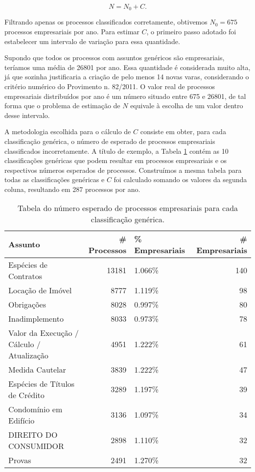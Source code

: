 \documentclass[]{book}
\begin{document}
\[ 
N = N_0 + C.
\]

Filtrando apenas os processos classificados corretamente, obtivemos
\(N_0 = 675\) processos empresariais por ano. Para estimar \(C\), o
primeiro passo adotado foi estabelecer um intervalo de variação para
essa quantidade.

Supondo que todos os processos com assuntos genéricos são empresariais,
teríamos uma média de 26801 por ano. Essa quantidade é considerada muito
alta, já que sozinha justificaria a criação de pelo menos 14 novas
varas, considerando o critério numérico do Provimento n. 82/2011. O
valor real de processos empresariais distribuídos por ano é um número
situado entre 675 e 26801, de tal forma que o problema de estimação de
\(N\) equivale à escolha de um valor dentro desse intervalo.

A metodologia escolhida para o cálculo de \(C\) consiste em obter, para
cada classificação genérica, o número de esperado de processos
empresariais classificados incorretamente. A título de exemplo, a Tabela
\ref{tab:esperados} contém as 10 classificações genéricas que podem
resultar em processos empresariais e os respectivos números esperados de
processos. Construímos a mesma tabela para todas as classificações
genéricas e \(C\) foi calculado somando os valores da segunda coluna,
resultando em 287 processos por ano.

\begin{longtable}[t]{lrlr}
\caption{\label{tab:esperados}Tabela do número esperado de processos empresariais para cada classificação genérica.}\\
\toprule
Assunto & \# Processos & \% Empresariais & \# Empresariais\\
\midrule
Espécies de Contratos & 13181 & 1.066\% & 140\\
Locação de Imóvel & 8777 & 1.119\% & 98\\
Obrigações & 8028 & 0.997\% & 80\\
Inadimplemento & 8033 & 0.973\% & 78\\
Valor da Execução / Cálculo / Atualização & 4951 & 1.222\% & 61\\
\addlinespace
Medida Cautelar & 3839 & 1.222\% & 47\\
Espécies de Títulos de Crédito & 3289 & 1.197\% & 39\\
Condomínio em Edifício & 3136 & 1.097\% & 34\\
DIREITO DO CONSUMIDOR & 2898 & 1.110\% & 32\\
Provas & 2491 & 1.270\% & 32\\
\bottomrule
\end{longtable}
\end{document}
